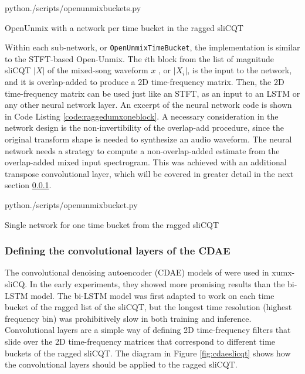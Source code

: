 \documentclass[report.tex]{subfiles}
\begin{document}
\begin{listing}[ht]
  \centering
\begin{inputminted}[linenos,breaklines,frame=single,fontsize=\scriptsize]{python}{./scripts/openunmixbuckets.py}
\end{inputminted}
  \caption{OpenUnmix with a network per time bucket in the ragged sliCQT}
  \label{code:raggedumx}
\end{listing}

Within each sub-network, or \Verb#OpenUnmixTimeBucket#, the implementation is similar to the STFT-based Open-Unmix. The $i$th block from the list of magnitude sliCQT $|X|$ of the mixed-song waveform $x$ , or $|X_{i}|$, is the input to the network, and it is overlap-added to produce a 2D time-frequency matrix. Then, the 2D time-frequency matrix can be used just like an STFT, as an input to an LSTM or any other neural network layer. An excerpt of the neural network code is shown in Code Listing \ref{code:raggedumxoneblock}.  A necessary consideration in the network design is the non-invertibility of the overlap-add procedure, since the original transform shape is needed to synthesize an audio waveform. The neural network needs a strategy to compute a non-overlap-added estimate from the overlap-added mixed input spectrogram. This was achieved with an additional transpose convolutional layer, which will be covered in greater detail in the next section \ref{sec:convlayers}.

\begin{listing}[ht]
  \centering
\begin{inputminted}[linenos,breaklines,frame=single,fontsize=\scriptsize]{python}{./scripts/openunmixbucket.py}
\end{inputminted}
  \caption{Single network for one time bucket from the ragged sliCQT}
  \label{code:raggedumxoneblock}
\end{listing}

\subsubsection{Defining the convolutional layers of the CDAE}
\label{sec:convlayers}

The convolutional denoising autoencoder (CDAE) models of \textcite{plumbley1, plumbley2} were used in xumx-sliCQ. In the early experiments, they showed more promising results than the bi-LSTM model. The bi-LSTM model was first adapted to work on each time bucket of the ragged list of the sliCQT, but the longest time resolution (highest frequency bin) was prohibitively slow in both training and inference. Convolutional layers are a simple way of defining 2D time-frequency filters that slide over the 2D time-frequency matrices that correspond to different time buckets of the ragged sliCQT. The diagram in Figure \ref{fig:cdaeslicqt} shows how the convolutional layers should be applied to the ragged sliCQT.
\end{document}
